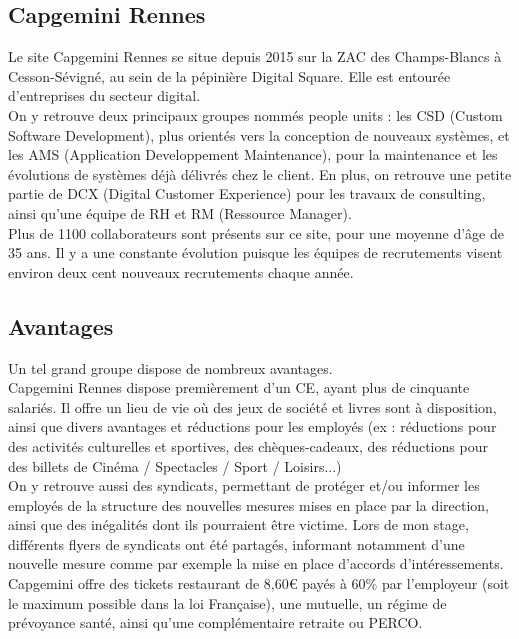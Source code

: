 \documentclass{rapport}
\begin{document}
\subsection{Capgemini Rennes}

Le site Capgemini Rennes se situe depuis 2015 sur la ZAC des Champs-Blancs à Cesson-Sévigné, au sein de la pépinière Digital Square. Elle est entourée d'entreprises du secteur digital. \\

On y retrouve deux principaux groupes nommés people units : les CSD (Custom Software Development), plus orientés vers la conception de nouveaux systèmes, et les AMS (Application Developpement Maintenance), pour la maintenance et les évolutions de systèmes déjà délivrés chez le client. En plus, on retrouve une petite partie de DCX (Digital Customer Experience) pour les travaux de consulting, ainsi qu'une équipe de RH et RM (Ressource Manager).\\

Plus de 1100 collaborateurs sont présents sur ce site, pour une moyenne d'âge de 35 ans. Il y a une constante évolution puisque les équipes de recrutements visent environ deux cent nouveaux recrutements chaque année. 

\subsection{Avantages}
Un tel grand groupe dispose de nombreux avantages.\\

Capgemini Rennes dispose premièrement d'un CE, ayant plus de cinquante salariés. Il offre un lieu de vie où des jeux de société et livres sont à disposition, ainsi que divers avantages et réductions pour les employés (ex : réductions pour des activités culturelles et sportives, des chèques-cadeaux, des réductions pour des billets de Cinéma / Spectacles / Sport / Loisirs...)\\

On y retrouve aussi des syndicats, permettant de protéger et/ou informer les employés de la structure des nouvelles mesures mises en place par la direction, ainsi que des inégalités dont ils pourraient être victime. Lors de mon stage,  différents flyers de syndicats ont été partagés, informant notamment d'une nouvelle mesure comme par exemple la mise en place d'accords d'intéressements.\\

Capgemini offre des tickets restaurant de 8,60€ payés à 60\% par l'employeur (soit le maximum possible dans la loi Française), une mutuelle, un régime de prévoyance santé, ainsi qu'une complémentaire retraite ou PERCO.\\
\end{document}
